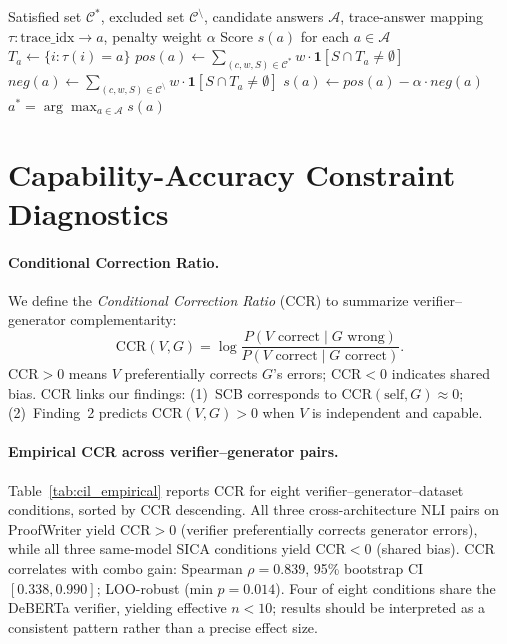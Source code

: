 \begin{algorithm}[h]
\caption{Source-Trace Attribution Scoring}
\label{alg:scorer}
\begin{algorithmic}[1]
\Require Satisfied set $\mathcal{C}^*$, excluded set $\mathcal{C}^{\setminus}$, candidate answers $\mathcal{A}$, trace-answer mapping $\tau: \text{trace\_idx} \to a$, penalty weight $\alpha$
\Ensure Score $s(a)$ for each $a \in \mathcal{A}$
    \State $T_a \gets \{i : \tau(i) = a\}$ 
    \State $\textit{pos}(a) \gets \sum_{(c,w,S) \in \mathcal{C}^*} w \cdot \mathbf{1}[S \cap T_a \neq \emptyset]$
    \State $\textit{neg}(a) \gets \sum_{(c,w,S) \in \mathcal{C}^{\setminus}} w \cdot \mathbf{1}[S \cap T_a \neq \emptyset]$
    \State $s(a) \gets \textit{pos}(a) - \alpha \cdot \textit{neg}(a)$
\EndFor
\State \Return $a^* = \arg\max_{a \in \mathcal{A}} s(a)$
\end{algorithmic}
\end{algorithm}


\section{Capability-Accuracy Constraint Diagnostics}
\label{app:diagnostics}
\label{app:cil}

\paragraph{Conditional Correction Ratio.}
We define the \textit{Conditional Correction Ratio} (CCR) to summarize verifier--generator complementarity:
\begin{equation}
\label{eq:cil}
\text{CCR}(V, G) = \log \frac{P(V \text{ correct} \mid G \text{ wrong})}{P(V \text{ correct} \mid G \text{ correct})}.
\end{equation}
$\text{CCR} > 0$ means $V$ preferentially corrects $G$'s errors; $\text{CCR} < 0$ indicates shared bias. CCR links our findings: (1)~SCB corresponds to $\text{CCR}(\text{self}, G) \approx 0$; (2)~Finding~2 predicts $\text{CCR}(V, G) > 0$ when $V$ is independent and capable.

\paragraph{Empirical CCR across verifier--generator pairs.}
Table~\ref{tab:cil_empirical} reports CCR for eight verifier--generator--dataset conditions, sorted by CCR descending. All three cross-architecture NLI pairs on ProofWriter yield $\text{CCR} > 0$ (verifier preferentially corrects generator errors), while all three same-model SICA conditions yield $\text{CCR} < 0$ (shared bias). CCR correlates with combo gain: Spearman $\rho = 0.839$, 95\% bootstrap CI $[0.338, 0.990]$; LOO-robust (min $p = 0.014$). Four of eight conditions share the DeBERTa verifier, yielding effective $n < 10$; results should be interpreted as a consistent pattern rather than a precise effect size.

